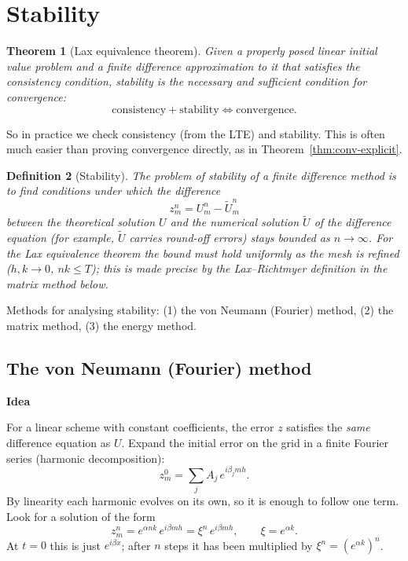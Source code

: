 \documentclass[11pt,a4paper]{article}
\numberwithin{equation}{section}
\theoremstyle{spacedplain}
\newtheorem{theorem}{Theorem}[section]
\theoremstyle{spaceddefinition}
\newtheorem{definition}[theorem]{Definition}
\theoremstyle{spacedremark}
\newcommand{\step}[1]{\par\addvspace{0.6em}\noindent\textbf{#1}\par\nobreak}
\begin{document}
\section{Stability}

\begin{keybox}
\begin{theorem}[Lax equivalence theorem]\label{thm:lax}
Given a properly posed linear initial value problem and a finite
difference approximation to it that satisfies the consistency
condition, stability is the necessary and sufficient condition for
convergence:
\[
  \text{consistency}+\text{stability}\iff\text{convergence}.
\]
\end{theorem}
\end{keybox}

So in practice we check consistency (from the LTE) and stability.  This
is often much easier than proving convergence directly, as in
Theorem~\ref{thm:conv-explicit}.

\begin{definition}[Stability]
The problem of stability of a finite difference method is to find
conditions under which the difference
\[
  z_m^n=U_m^n-\widetilde U_m^n
\]
between the theoretical solution \(U\) and the numerical solution
\(\widetilde U\) of the \emph{difference} equation (for example,
\(\widetilde U\) carries round-off errors) stays bounded as
\(n\to\infty\).  For the Lax equivalence theorem the bound must hold
uniformly as the mesh is refined (\(h,k\to0\), \(nk\le T\)); this is made
precise by the Lax--Richtmyer definition in the matrix method below.
\end{definition}

Methods for analysing stability: (1) the von Neumann (Fourier) method,
(2) the matrix method, (3) the energy method.

\subsection{The von Neumann (Fourier) method}

\step{Idea}
For a linear scheme with constant coefficients, the
error \(z\) satisfies the \emph{same} difference equation as \(U\).
Expand the initial error on the grid in a finite Fourier series
(harmonic decomposition):
\[
  z_m^0=\sum_jA_j\,e^{i\beta_jmh}.
\]
By linearity each harmonic evolves on its own, so it is enough to
follow one term.  Look for a solution of the form
\[
  z_m^n=e^{\alpha nk}\,e^{i\beta mh}=\xi^n\,e^{i\beta mh},
  \qquad \xi=e^{\alpha k}.
\]
At \(t=0\) this is just \(e^{i\beta x}\); after \(n\) steps it has been
multiplied by \(\xi^n=(e^{\alpha k})^n\).
\end{document}
